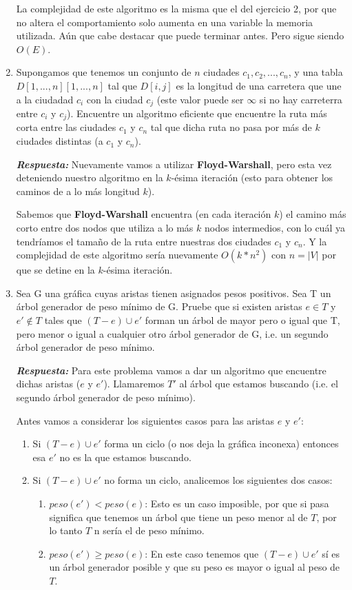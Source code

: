 \documentclass[11pt,letterpaper]{article}
\newcommand\respuesta{\textbf{\textit{Respuesta: }}}
\begin{document}
\begin{enumerate}[leftmargin=*]
    La complejidad de este algoritmo es la misma que el del ejercicio 2, por que no altera el comportamiento solo aumenta en una variable la memoria utilizada.
    Aún que cabe destacar que puede terminar antes.
    Pero sigue siendo $O(E)$.

    \item Supongamos que tenemos un conjunto de $n$ ciudades $c_1, c_2,...,c_n$, y una tabla $D[1,...,n][1,...,n]$ tal que $D[i,j]$ es la longitud de una carretera que une a la ciudadad $c_i$ con la ciudad $c_j$ (este valor puede ser $\infty$ si no hay carreterra entre $c_i$ y $c_j$).
    Encuentre un algoritmo eficiente que encuentre la ruta más corta entre las ciudades $c_1$ y $c_n$ tal que dicha ruta no pasa por más de $k$ ciudades distintas (a $c_1$ y $c_n$).

    \respuesta Nuevamente vamos a utilizar \textbf{Floyd-Warshall}, pero esta vez deteniendo nuestro algoritmo en la $k$-ésima iteración (esto para obtener los caminos de a lo más longitud $k$).
    
    Sabemos que \textbf{Floyd-Warshall} encuentra (en cada iteración $k$) el camino más corto entre dos nodos que utiliza a lo más $k$ nodos intermedios, con lo cuál ya tendríamos el tamaño de la ruta entre nuestras dos ciudades $c_1$ y $c_n$.
    Y la complejidad de este algoritmo sería nuevamente $O(k * n^2)$ con $n = |V|$ por que se detine en la $k$-ésima iteración.
    
    \item Sea G una gráfica cuyas aristas tienen asignados pesos positivos.
    Sea T un árbol generador de peso mínimo de G.
    Pruebe que si existen aristas $e \in T$ y $e' \notin T$ tales que $(T - e) \cup {e'}$ forman un árbol de mayor pero o igual que T, pero menor o igual a cualquier otro árbol generador de G, i.e. un segundo árbol generador de peso mínimo.

    \respuesta Para este problema vamos a dar un algoritmo que encuentre dichas aristas ($e$ y $e'$).
    Llamaremos $T'$ al árbol que estamos buscando (i.e. el segundo árbol generador de peso mínimo).

    Antes vamos a considerar los siguientes casos para las aristas $e$ y $e'$:
    \begin{enumerate}
      \item Si $(T - e) \cup {e'}$ forma un ciclo (o nos deja la gráfica inconexa) entonces esa $e'$ no es la que estamos buscando.
      \item Si $(T - e) \cup {e'}$ no forma un ciclo, analicemos los siguientes dos casos:
      \begin{enumerate}
        \item $peso(e') < peso(e)$: Esto es un caso imposible, por que si pasa significa que tenemos un árbol que tiene un peso menor al de $T$, por lo tanto $T$ n sería el de peso mínimo.
        \item $peso(e') \geq peso(e)$: En este caso tenemos que $(T - e) \cup {e'}$ sí es un árbol generador posible y que su peso es mayor o igual al peso de $T$.  
      \end{enumerate}
    \end{enumerate} 


\end{enumerate}
\end{document}
